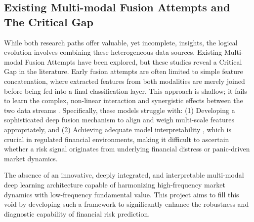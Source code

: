 \subsection{Existing Multi-modal Fusion Attempts and The Critical Gap}
While both research paths offer valuable, yet incomplete, insights, the logical evolution involves combining these heterogeneous data sources. Existing Multi-modal Fusion Attempts have been explored, but these studies reveal a Critical Gap in the literature. Early fusion attempts are often limited to simple feature concatenation, where extracted features from both modalities are merely joined before being fed into a final classification layer. This approach is shallow; it fails to learn the complex, non-linear interaction and synergistic effects between the two data streams . Specifically, these models struggle with: (1) Developing a sophisticated deep fusion mechanism to align and weigh multi-scale features appropriately, and (2) Achieving adequate model interpretability , which is crucial in regulated financial environments, making it difficult to ascertain whether a risk signal originates from underlying financial distress or panic-driven market dynamics.

The absence of an innovative, deeply integrated, and interpretable multi-modal deep learning architecture capable of harmonizing high-frequency market dynamics with low-frequency fundamental value. This project aims to fill this void by developing such a framework to significantly enhance the robustness and diagnostic capability of financial risk prediction.